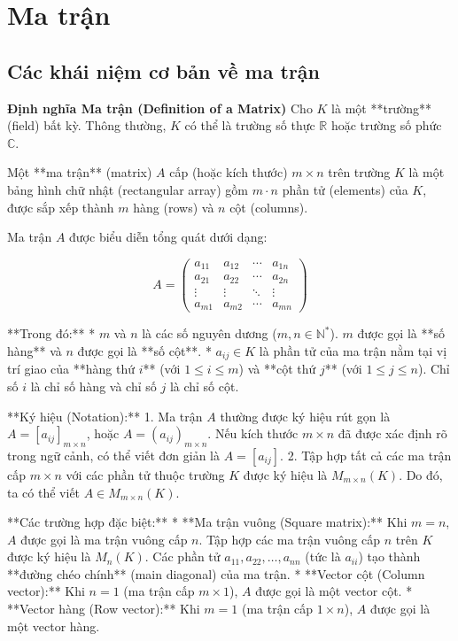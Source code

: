 
\chapter{Ma trận}

\section{Các khái niệm cơ bản về ma trận}
\textbf{Định nghĩa Ma trận (Definition of a Matrix)}
Cho $K$ là một **trường** (field) bất kỳ. Thông thường, $K$ có thể là trường số thực $\mathbb{R}$ hoặc trường số phức $\mathbb{C}$.

Một **ma trận** (matrix) $A$ cấp (hoặc kích thước) $m \times n$ trên trường $K$ là một bảng hình chữ nhật (rectangular array) gồm $m \cdot n$ phần tử (elements) của $K$, được sắp xếp thành $m$ hàng (rows) và $n$ cột (columns).

Ma trận $A$ được biểu diễn tổng quát dưới dạng:

$$
A =
\begin{pmatrix}
a_{11} & a_{12} & \cdots & a_{1n} \\
a_{21} & a_{22} & \cdots & a_{2n} \\
\vdots & \vdots & \ddots & \vdots \\
a_{m1} & a_{m2} & \cdots & a_{mn}
\end{pmatrix}
$$

**Trong đó:**
* $m$ và $n$ là các số nguyên dương ($m, n \in \mathbb{N}^*$). $m$ được gọi là **số hàng** và $n$ được gọi là **số cột**.
* $a_{ij} \in K$ là phần tử của ma trận nằm tại vị trí giao của **hàng thứ $i$** (với $1 \le i \le m$) và **cột thứ $j$** (với $1 \le j \le n$). Chỉ số $i$ là chỉ số hàng và chỉ số $j$ là chỉ số cột.

**Ký hiệu (Notation):**
1.  Ma trận $A$ thường được ký hiệu rút gọn là $A = [a_{ij}]_{m \times n}$, hoặc $A = (a_{ij})_{m \times n}$. Nếu kích thước $m \times n$ đã được xác định rõ trong ngữ cảnh, có thể viết đơn giản là $A = [a_{ij}]$.
2.  Tập hợp tất cả các ma trận cấp $m \times n$ với các phần tử thuộc trường $K$ được ký hiệu là $M_{m \times n}(K)$. Do đó, ta có thể viết $A \in M_{m \times n}(K)$.

**Các trường hợp đặc biệt:**
* **Ma trận vuông (Square matrix):** Khi $m = n$, $A$ được gọi là ma trận vuông cấp $n$. Tập hợp các ma trận vuông cấp $n$ trên $K$ được ký hiệu là $M_n(K)$. Các phần tử $a_{11}, a_{22}, \dots, a_{nn}$ (tức là $a_{ii}$) tạo thành **đường chéo chính** (main diagonal) của ma trận.
* **Vector cột (Column vector):** Khi $n = 1$ (ma trận cấp $m \times 1$), $A$ được gọi là một vector cột.
* **Vector hàng (Row vector):** Khi $m = 1$ (ma trận cấp $1 \times n$), $A$ được gọi là một vector hàng.


